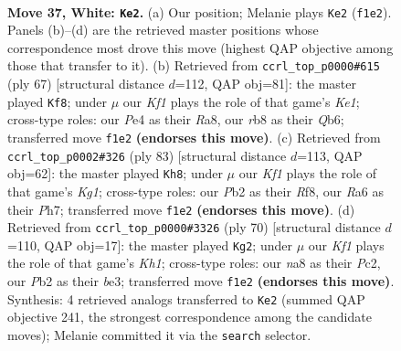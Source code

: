 \documentclass[11pt]{article}
\begin{document}
\clearpage

\begin{figure}[p]\centering
\begin{subfigure}{0.46\textwidth}\centering
\resizebox{\linewidth}{!}{%
\newchessgame
\chessboard[
  setfen={nr4k1/Q4pb1/R7/4p3/4P3/1r2Bn2/1P3RN1/1N3K1q w - - 4 37},
  showmover=false,
  pgfstyle=straightmove, color=movearrow, markmove={f1-e2}
]}
\caption{}
\end{subfigure}\hfill
\begin{subfigure}{0.46\textwidth}\centering
\resizebox{\linewidth}{!}{%
\newchessgame
\chessboard[
  setfen={r2rk3/8/1q2p1Q1/2b1P3/pn6/7P/1P2bPP1/3RR1K1 b - - 7 34},
  showmover=false,
  pgfstyle=straightmove, color=movearrow, markmove={e8-f8}
]}
\caption{}
\end{subfigure}
\\[4pt]
\begin{subfigure}{0.46\textwidth}\centering
\resizebox{\linewidth}{!}{%
\newchessgame
\chessboard[
  setfen={2R2rk1/5r1p/8/P5Q1/4p1n1/5bN1/1q3P1P/2R3K1 b - - 0 42},
  showmover=false,
  pgfstyle=straightmove, color=movearrow, markmove={g8-h8}
]}
\caption{}
\end{subfigure}\hfill
\begin{subfigure}{0.46\textwidth}\centering
\resizebox{\linewidth}{!}{%
\newchessgame
\chessboard[
  setfen={r6k/1p3Qnn/2p1r3/p7/3q2P1/P2BbRBP/2P5/4R2K w - - 9 36},
  showmover=false,
  pgfstyle=straightmove, color=movearrow, markmove={h1-g2}
]}
\caption{}
\end{subfigure}
\caption{\textbf{Move 37, White: \texttt{Ke2}.} (a) Our position; Melanie plays \texttt{Ke2} (\texttt{f1e2}). Panels (b)--(d) are the retrieved master positions whose correspondence most drove this move (highest QAP objective among those that transfer to it). (b) Retrieved from \texttt{ccrl\_top\_p0000\#615} (ply 67) [structural distance $d$=112, QAP obj=81]: the master played \texttt{Kf8}; under $\mu$ our \emph{Kf1} plays the role of that game's \emph{Ke1}; cross-type roles: our \emph{P}e4 as their \emph{R}a8, our \emph{r}b8 as their \emph{Q}b6; transferred move \texttt{f1e2} \textbf{(endorses this move)}. (c) Retrieved from \texttt{ccrl\_top\_p0002\#326} (ply 83) [structural distance $d$=113, QAP obj=62]: the master played \texttt{Kh8}; under $\mu$ our \emph{Kf1} plays the role of that game's \emph{Kg1}; cross-type roles: our \emph{P}b2 as their \emph{R}f8, our \emph{R}a6 as their \emph{P}h7; transferred move \texttt{f1e2} \textbf{(endorses this move)}. (d) Retrieved from \texttt{ccrl\_top\_p0000\#3326} (ply 70) [structural distance $d$=110, QAP obj=17]: the master played \texttt{Kg2}; under $\mu$ our \emph{Kf1} plays the role of that game's \emph{Kh1}; cross-type roles: our \emph{n}a8 as their \emph{P}c2, our \emph{P}b2 as their \emph{b}e3; transferred move \texttt{f1e2} \textbf{(endorses this move)}. Synthesis: 4 retrieved analogs transferred to \texttt{Ke2} (summed QAP objective 241, the strongest correspondence among the candidate moves); Melanie committed it via the \texttt{search} selector.}
\label{fig:thought-m72}
\end{figure}
\end{document}
